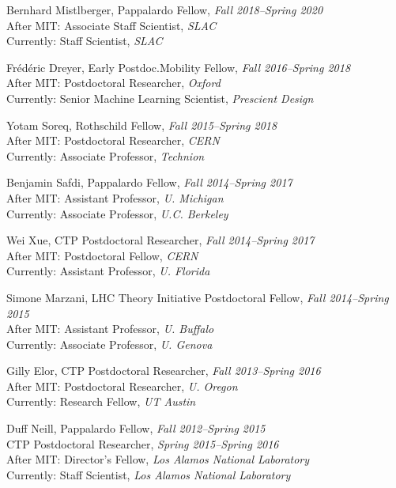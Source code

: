 \item Bernhard Mistlberger, Pappalardo Fellow, \emph{Fall 2018--Spring 2020}
\\ After MIT: Associate Staff Scientist, \emph{SLAC}
\\ Currently: Staff Scientist, \emph{SLAC}

\item Frédéric Dreyer, Early Postdoc.Mobility Fellow, \emph{Fall 2016--Spring 2018}
\\ After MIT: Postdoctoral Researcher, \emph{Oxford}
\\ Currently: Senior Machine Learning Scientist, \emph{Prescient Design}

\item Yotam Soreq, Rothschild Fellow, \emph{Fall 2015--Spring 2018}
\\ After MIT: Postdoctoral Researcher, \emph{CERN}
\\ Currently: Associate Professor, \emph{Technion}

\item Benjamin Safdi, Pappalardo Fellow, \emph{Fall 2014--Spring 2017}
\\ After MIT: Assistant Professor, \emph{U. Michigan}
\\ Currently: Associate Professor, \emph{U.C. Berkeley}

\item Wei Xue, CTP Postdoctoral Researcher, \emph{Fall 2014--Spring 2017}
\\ After MIT: Postdoctoral Fellow, \emph{CERN}
\\ Currently: Assistant Professor, \emph{U. Florida}

\item Simone Marzani, LHC Theory Initiative Postdoctoral Fellow, \emph{Fall 2014--Spring 2015}
\\ After MIT: Assistant Professor, \emph{U. Buffalo}
\\ Currently: Associate Professor, \emph{U. Genova}

\item Gilly Elor, CTP Postdoctoral Researcher, \emph{Fall 2013--Spring 2016}
\\ After MIT: Postdoctoral Researcher, \emph{U. Oregon}
\\ Currently: Research Fellow, \emph{UT Austin}

\item Duff Neill, Pappalardo Fellow, \emph{Fall 2012--Spring 2015}
\\ CTP Postdoctoral Researcher, \emph{Spring 2015--Spring 2016}
\\ After MIT: Director's Fellow, \emph{Los Alamos National Laboratory}
\\ Currently: Staff Scientist, \emph{Los Alamos National Laboratory}

